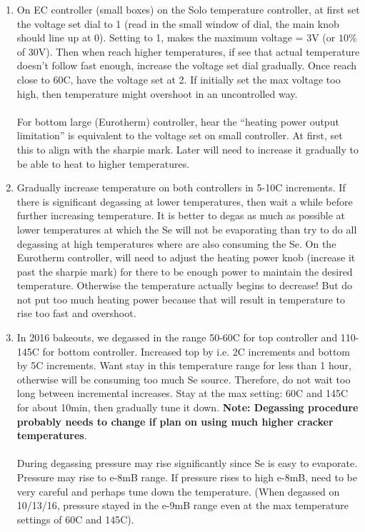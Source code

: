 \begin{enumerate}

\item On EC controller (small boxes) on the Solo temperature controller, at first set the voltage set dial to 1 (read in the small window of dial, the main knob should line up at 0). Setting to 1, makes the maximum voltage = 3V (or $10\%$ of 30V). Then when reach higher temperatures, if see that actual temperature doesn’t follow fast enough, increase the voltage set dial gradually. Once reach close to 60C, have the voltage set at 2. If initially set the max voltage too high, then temperature might overshoot in an uncontrolled way.\\\\
For bottom large (Eurotherm) controller, hear the “heating power output limitation” is equivalent to the voltage set on small controller. At first, set this to align with the sharpie mark. Later will need to increase it gradually to be able to heat to higher temperatures.
\item Gradually increase temperature on both controllers in 5-10C increments. If there is significant degassing at lower temperatures, then wait a while before further increasing temperature. It is better to degas as much as possible at lower temperatures at which the Se will not be evaporating than try to do all degassing at high temperatures where are also consuming the Se. On the Eurotherm controller, will need to adjust the heating power knob (increase it past the sharpie mark) for there to be enough power to maintain the desired temperature. Otherwise the temperature actually begins to decrease! But do not put too much heating power because that will result in temperature to rise too fast and overshoot.
\item In 2016 bakeouts, we degassed in the range 50-60C for top controller and 110-145C for bottom controller. Increased top by i.e. 2C increments and bottom by 5C increments. Want stay in this temperature range for less than 1 hour, otherwise will be consuming too much Se source. Therefore, do not wait too long between incremental increases.  Stay at the max setting: 60C and 145C for about 10min, then gradually tune it down. 
\textbf{Note: Degassing procedure probably needs to change if plan on using much higher cracker temperatures}.\\\\
During degassing pressure may rise significantly since Se is easy to evaporate. Pressure may rise to e-8mB range. If pressure rises to high e-8mB, need to be very careful and perhaps tune down the temperature.
(When degassed on 10/13/16, pressure stayed in the e-9mB range even at the max temperature settings of 60C and 145C).
\end{enumerate}
